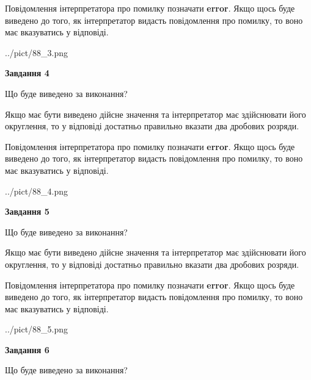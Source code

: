 \documentclass[12pt, ukrainian]{article}
\begin{document}
{\begin {Large}
Повідомлення інтерпретатора про помилку позначати \textbf{error}.
Якщо щось буде виведено до того, як інтерпретатор видасть повідомлення про помилку, 
то воно має вказуватись у відповіді. \par

\begin{center}
	{../pict/88_3.png}
\end{center}
\newpage

{\begin {center}\textbf{Завдання 4}\end {center}}\par
Що буде виведено за виконання? \par

Якщо має бути виведено дійсне значення та інтерпретатор має здійснювати його округлення, 
то у відповіді достатньо правильно вказати два дробових розряди.

Повідомлення інтерпретатора про помилку позначати \textbf{error}.
Якщо щось буде виведено до того, як інтерпретатор видасть повідомлення про помилку, 
то воно має вказуватись у відповіді. \par

\begin{center}
	{../pict/88_4.png}
\end{center}
\newpage

{\begin {center}\textbf{Завдання 5}\end {center}}\par
Що буде виведено за виконання? \par

Якщо має бути виведено дійсне значення та інтерпретатор має здійснювати його округлення, 
то у відповіді достатньо правильно вказати два дробових розряди.

Повідомлення інтерпретатора про помилку позначати \textbf{error}.
Якщо щось буде виведено до того, як інтерпретатор видасть повідомлення про помилку, 
то воно має вказуватись у відповіді. \par

\begin{center}
	{../pict/88_5.png}
\end{center}
\newpage

{\begin {center}\textbf{Завдання 6}\end {center}}\par
Що буде виведено за виконання? \par


\end{Large}}
\end{document}

